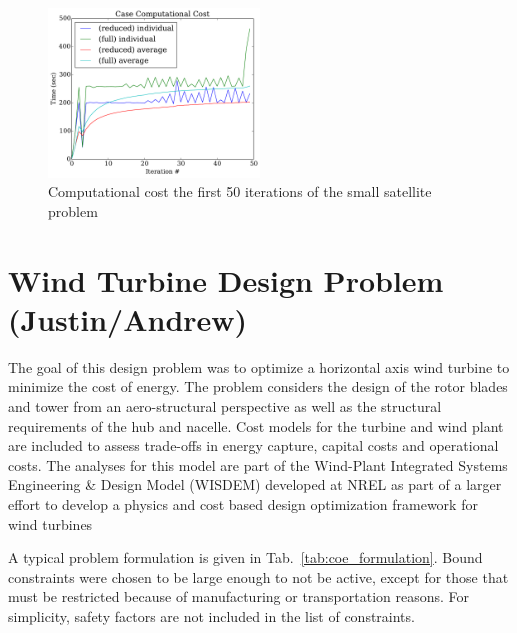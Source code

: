 \documentclass[]{aiaa-tc} %
\begin{document}
            \begin{figure}[!htbp]
                \centering
                \includegraphics[width=0.5\textwidth]{images/cadre_compute_cost}
                \caption{Computational cost the first 50 iterations of the small satellite problem}
                \label{fig:cadre-compute-cost}
            \end{figure}


  \section{Wind Turbine Design Problem (Justin/Andrew)}

    The goal of this design problem was to optimize a horizontal axis wind turbine to minimize the cost of energy. The problem considers the design of the rotor blades and tower from an aero-structural perspective as well as the structural requirements of the hub and nacelle.  Cost models for the turbine and wind plant are included to assess trade-offs in energy capture, capital costs and operational costs.  The analyses for this model are part of the Wind-Plant Integrated Systems Engineering \& Design Model (WISDEM) developed at NREL as part of a larger effort to develop a physics and cost based design optimization framework for wind turbines  \cite{Dykes2014a,Ning2013a,Ning2014,Ning2014d}

    A typical problem formulation is given in Tab.~\ref{tab:coe_formulation}.  Bound constraints were chosen to be large enough to not be active, except for those that must be restricted because of manufacturing or transportation reasons.  For simplicity, safety factors are not included in the list of constraints.
\end{document}
